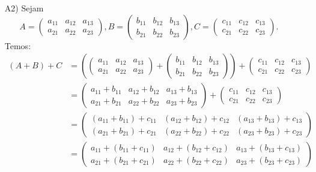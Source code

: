 \begin{exemplo}
\begin{enumerate}[label={\arabic*})]
\begin{solucao}
\begin{itemize}
				      \item[A2)] Sejam
					      \[
						      A = \begin{pmatrix} a_{11} & a_{12} & a_{13}\\a_{21} & a_{22} & a_{23}\end{pmatrix},
						      B = \begin{pmatrix} b_{11} & b_{12} & b_{13}\\b_{21} & b_{22} & b_{23}\end{pmatrix},
						      C = \begin{pmatrix} c_{11} & c_{12} & c_{13}\\c_{21} & c_{22} & c_{23}\end{pmatrix}.
					      \]
					      Temos:
					      \begin{align*}
						      (A + B) + C & = \left(\begin{pmatrix} a_{11} & a_{12} & a_{13}\\a_{21} & a_{22} & a_{23}\end{pmatrix} +
						      \begin{pmatrix} b_{11} & b_{12} & b_{13}\\b_{21} & b_{22} & b_{23}\end{pmatrix}\right) +
						      \begin{pmatrix} c_{11} & c_{12} & c_{13}\\c_{21} & c_{22} & c_{23}\end{pmatrix}
						      \\ &= \begin{pmatrix} a_{11} + b_{11} & a_{12} + b_{12} & a_{13} + b_{13}\\a_{21} + b_{21} & a_{22} + b_{22} & a_{23} + b_{23}\end{pmatrix} +
						      \begin{pmatrix} c_{11} & c_{12} & c_{13}\\c_{21} & c_{22} & c_{23}\end{pmatrix}
						      \\ &= \begin{pmatrix} (a_{11} + b_{11}) + c_{11} & (a_{12} + b_{12}) + c_{12} & (a_{13} + b_{13}) + c_{13}\\(a_{21} + b_{21}) + c_{21} & (a_{22} + b_{22}) + c_{22} & (a_{23} + b_{23}) + c_{23}\end{pmatrix}
						      \\ &= \begin{pmatrix} a_{11} + (b_{11} + c_{11}) & a_{12} + (b_{12} + c_{12}) & a_{13} + (b_{13} + c_{13})\\a_{21} + (b_{21} + c_{21}) & a_{22} + (b_{22} + c_{22}) & a_{23} + (b_{23} + c_{23})\end{pmatrix}

\end{align*}
\end{itemize}
\end{solucao}
\end{enumerate}
\end{exemplo}
